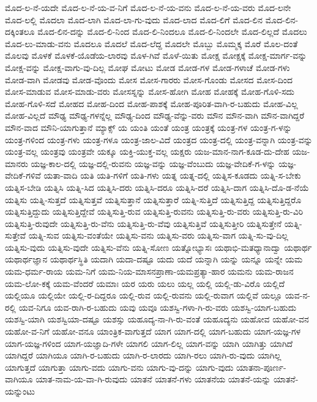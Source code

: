 {ಮೊದ-ಲ-ನೆ-ಯದೇ
ಮೊದ-ಲ-ನೆ-ಯ-ವ-ನಿಗೆ
ಮೊದ-ಲ-ನೆ-ಯ-ವನು
ಮೊದ-ಲ-ನೆ-ಯ-ವರು
ಮೊದ-ಲನೇ
ಮೊದ-ಲಲ್ಲಿ
ಮೊದಲಾ
ಮೊದ-ಲಾಗಿ
ಮೊದ-ಲಾ-ಗು-ವುದು
ಮೊದ-ಲಾದ
ಮೊದ-ಲಿಗೆ
ಮೊದ-ಲಿನ
ಮೊದ-ಲಿನ-ದಕ್ಕಿಂತಲೂ
ಮೊದ-ಲಿನ-ದನ್ನು
ಮೊದ-ಲಿ-ನಿಂದ
ಮೊದ-ಲಿ-ನಿಂದಲೂ
ಮೊದ-ಲಿ-ನಿಂದಲೇ
ಮೊದ-ಲಿಲ್ಲದೆ
ಮೊದಲು
ಮೊದ-ಲು-ಮಾಡು-ವನು
ಮೊದಲೂ
ಮೊದಲೆ
ಮೊದ-ಲೆದ್ದ
ಮೊದಲೇ
ಮೊಬ್ಬು
ಮೊಮ್ಮಕ್ಕ
ಮೊರೆ
ಮೊಲ-ದಂತೆ
ಮೊಲವು
ಮೊಳಕೆ
ಮೊಳಕೆ-ಯೊಡೆಯ-ಲಾರವು
ಮೊಳ-ಗಿವೆ
ಮೊಳೆ-ಯಿತು
ಮೋಕ್ಷ
ಮೋಕ್ಷಕ್ಕೆ
ಮೋಕ್ಷ-ಮಾರ್ಗ-ವನ್ನು
ಮೋಕ್ಷ-ವನ್ನು
ಮೋಕ್ಷ-ವಾಗು-ವು-ದಿಲ್ಲ
ಮೋಘ
ಮೋಟು
ಮೋಡ
ಮೋಡ-ಗಳ
ಮೋಡ-ಗಳಾಚೆ
ಮೋಡ-ಗಳು
ಮೋಡ-ವಾಗಿ
ಮೋಡವು
ಮೋಡ-ವೊಂದು
ಮೋಸ
ಮೋಸ-ಗಾರರು
ಮೋಸ-ಗೊಂಡು
ಮೋಸದ
ಮೋಸ-ದಿಂದ
ಮೋಸ-ಮಾಡುವ
ಮೋಸ-ಮಾಡು-ವರು
ಮೋಸಸ್ನನ್ನು
ಮೋಸ-ಹೋಗಿ
ಮೋಹ
ಮೋಹಕ್ಕೆ
ಮೋಹ-ಗೊಳಿ-ಸದು
ಮೋಹ-ಗೊಳಿ-ಸದೆ
ಮೋಹದ
ಮೋಹ-ದಿಂದ
ಮೋಹ-ಪಾಶಕ್ಕೆ
ಮೋಹ-ಪೂರಿತ-ವಾಗಿ-ರ-ಬಹುದು
ಮೋಹ-ವಿಲ್ಲ
ಮೋಹ-ವಿಲ್ಲದೆ
ಮೌಢ್ಯ
ಮೌಢ್ಯ-ಗಳನ್ನೆಲ್ಲ
ಮೌಢ್ಯ-ದಿಂದ
ಮೌಢ್ಯ-ವೆನ್ನು-ವರು
ಮೌನ
ಮೌನ-ವಾಗಿ
ಮೌನ-ವಾಗಿದ್ದರೆ
ಮೌನ-ವಾದ
ಮೌನಿ-ಯಾಗುತ್ತಾನೆ
ಮ್ಯಾಕ್ಸ್
ಯ
ಯಂತಿ
ಯಂತೆ
ಯಂತ್ರ
ಯಂತ್ರಕ್ಕೆ
ಯಂತ್ರ-ಗಳ
ಯಂತ್ರ-ಗ-ಳನ್ನು
ಯಂತ್ರ-ಗಳಿಂದ
ಯಂತ್ರ-ಗಳು
ಯಂತ್ರ-ಗಳೂ
ಯಂತ್ರ-ಜಾಲ-ವಿದೆ
ಯಂತ್ರದ
ಯಂತ್ರ-ದಲ್ಲಿ
ಯಂತ್ರ-ವನ್ನಾಗಿ
ಯಂತ್ರ-ವನ್ನು
ಯಂತ್ರ-ವಲ್ಲ
ಯಂತ್ರವು
ಯಂತ್ರವೇ
ಯಕ್ಕೂ
ಯಕ್ತಿ-ಯುಕ್ತ-ವಲ್ಲ
ಯಕ್ಷರು
ಯಜ-ಮಾನ-ನಾಗ-ಕೂಡ-ದು-ದೇಹ
ಯಜ-ಮಾನರು
ಯಜ್ಞ-ಕಾಲ-ದಲ್ಲಿ
ಯಜ್ಞ-ದಲ್ಲಿ-ರುವನು
ಯಜ್ಞ-ವನ್ನು
ಯಜ್ಞ-ವೆಂಬುದು
ಯಜ್ಞ-ವೇದಿಕೆ-ಗ-ಳನ್ನು
ಯಜ್ಞ-ವೇದಿಕೆ-ಗಳಿವೆ
ಯತಾ-ವಾದಿ
ಯತಿ
ಯತಿ-ಗಳಿಗೆ
ಯತಿ-ಗಳು
ಯತ್ನ
ಯತ್ನ-ದಲ್ಲಿ
ಯತ್ನಿಸ-ಕೂಡದು
ಯತ್ನಿ-ಸ-ಬೇಕು
ಯತ್ನಿಸ-ಬೇಡಿ
ಯತ್ನಿಸಿ
ಯತ್ನಿ-ಸಿದ
ಯತ್ನಿಸಿ-ದರು
ಯತ್ನಿಸಿ-ದರೂ
ಯತ್ನಿಸಿ-ದರೆ
ಯತ್ನಿಸಿ-ದಾಗ
ಯತ್ನಿಸಿ-ದೊ-ಡ-ನೆಯೆ
ಯತ್ನಿಸು
ಯತ್ನಿ-ಸುತ್ತದೆ
ಯತ್ನಿಸುತ್ತವೆ
ಯತ್ನಿಸುತ್ತಾನೆ
ಯತ್ನಿಸುತ್ತಾರೆ
ಯತ್ನಿ-ಸುತ್ತಿದೆ
ಯತ್ನಿಸುತ್ತಿದ್ದ
ಯತ್ನಿಸುತ್ತಿದ್ದರೊ
ಯತ್ನಿಸುತ್ತಿದ್ದುದು
ಯತ್ನಿಸುತ್ತಿದ್ದೇವೆ
ಯತ್ನಿಸುತ್ತಿ-ರುವ
ಯತ್ನಿಸುತ್ತಿ-ರುವನು
ಯತ್ನಿಸುತ್ತಿ-ರು-ವರು
ಯತ್ನಿಸುತ್ತಿ-ರು-ವಿರಿ
ಯತ್ನಿಸುತ್ತಿ-ರುವುದೇ
ಯತ್ನಿಸುತ್ತಿ-ರು-ವೆನು
ಯತ್ನಿಸುತ್ತಿ-ರು-ವೆವು
ಯತ್ನಿಸುತ್ತಿವೆ
ಯತ್ನಿಸುತ್ತೀರಿ
ಯತ್ನಿಸುತ್ತೇನೆ
ಯತ್ನಿ-ಸುತ್ತೇವೆ
ಯತ್ನಿ-ಸುವ
ಯತ್ನಿಸು-ವಂತೆಯೇ
ಯತ್ನಿಸು-ವನು
ಯತ್ನಿಸು-ವರು
ಯತ್ನಿಸು-ವಾಗ
ಯತ್ನಿ-ಸು-ವು-ದಿಲ್ಲ
ಯತ್ನಿಸು-ವುದು
ಯತ್ನಿಸು-ವುದೇ
ಯತ್ನಿಸು-ವೆನು
ಯತ್ನಿ-ಸೋಣ
ಯತ್ನೋಭ್ಯಾಸಃ
ಯಥಾಭಿ-ಮತಧ್ಯಾನಾದ್ವಾ
ಯಥಾರ್ಥ
ಯಥಾರ್ಥಜ್ಞಾನ
ಯಥಾರ್ಥಸ್ಥಿತಿ
ಯದಾಗಿ
ಯದಾ-ದಷ್ಟೂ
ಯದು
ಯದೆ
ಯನ್ನಾಗಿ
ಯನ್ನು
ಯನ್ನೂ
ಯನ್ನೇ
ಯಮ
ಯಮ-ಧರ್ಮ-ರಾಯ
ಯಮ-ನಿಗೆ
ಯಮ-ನಿಯ-ಮಾಸನಪ್ರಾಣಾ-ಯಮಪ್ರತ್ಯಾ-ಹಾರ
ಯಮನು
ಯಮ-ರಾಜನ
ಯಮ-ಲೋ-ಕಕ್ಕೆ
ಯಮ-ವೆಂದರೆ
ಯಮಾಃ
ಯರ
ಯರು
ಯಲು
ಯಲ್ಲ
ಯಲ್ಲಿ
ಯಲ್ಲಿ-ಡು-ವಿರೊ
ಯಲ್ಲಿದೆ
ಯಲ್ಲಿಯೂ
ಯಲ್ಲಿಯೇ
ಯಲ್ಲಿ-ರ-ದಿದ್ದರೂ
ಯಲ್ಲಿ-ರುವ
ಯಲ್ಲಿ-ರುವನು
ಯಲ್ಲಿ-ರುವಾಗ
ಯಲ್ಲಿವೆ
ಯಲ್ಲೂ
ಯವ-ನ-ರಲ್ಲಿ
ಯವ-ನಿಗೂ
ಯವ-ರಾಗಿ-ರ-ಬಹುದು
ಯವು
ಯವೂ
ಯಶಸ್ವಿ-ಗಳಾ-ಗಿ-ರು-ವರು
ಯಶಸ್ವಿ-ಯಾಗ-ಬಹುದು
ಯಶಸ್ವಿ-ಯಾಗಿ
ಯಶಸ್ವಿಯಾ-ದಷ್ಟೂ
ಯಶಸ್ಸು
ಯಹೂದ್ಯ-ನಾ-ಗಿ-ರು-ವಂತೆ
ಯಹೂದ್ಯನು
ಯಹೋವ
ಯಹೋ-ವನ
ಯಹೋ-ವ-ನಿಗೆ
ಯಹೋ-ವನೂ
ಯಾಂತ್ರಿಕ-ವಾಗುತ್ತದೆ
ಯಾಗ
ಯಾಗ-ದಲ್ಲಿ
ಯಾಗ-ಬಹುದು
ಯಾಗ-ಯಜ್ಞ-ಗಳ
ಯಾಗ-ಯಜ್ಞ-ಗಳಿಂದ
ಯಾಗ-ಯಜ್ಞಾದಿ-ಗಳೇ
ಯಾಗಲಿ
ಯಾಗ-ಲಿಲ್ಲ
ಯಾಗ-ವನ್ನು
ಯಾಗಿ
ಯಾಗಿತ್ತು
ಯಾಗಿದೆ
ಯಾಗಿದ್ದರೆ
ಯಾಗಿಯೂ
ಯಾಗಿ-ರ-ಬಹುದು
ಯಾಗಿ-ರ-ಲಾರದು
ಯಾಗಿ-ರಲು
ಯಾಗಿ-ರು-ವುದು
ಯಾಗಿಲ್ಲ
ಯಾಗುತ್ತದೆ
ಯಾಗುತ್ತಾ
ಯಾಗು-ವದು
ಯಾಗು-ವನು
ಯಾಗು-ವು-ದನ್ನು
ಯಾಗು-ವುದು
ಯಾತನಾ-ಪೂರ್ಣ-ವಾಗಿಯೂ
ಯಾತ-ನಾಮ-ಯ-ವಾ-ಗಿ-ರುವುದು
ಯಾತನೆ
ಯಾತನೆ-ಗಳು
ಯಾತನೆಯ
ಯಾತನೆ-ಯನ್ನು
ಯಾತನೆ-ಯನ್ನುಂಟು
}
